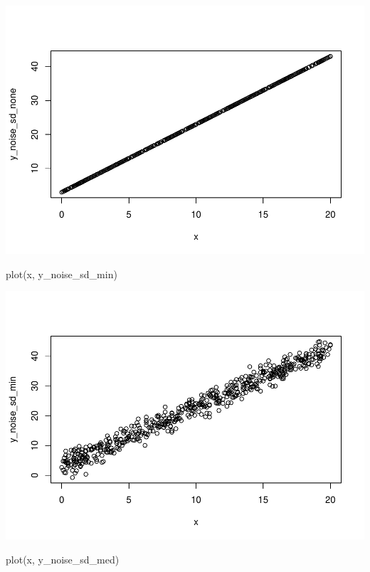 \documentclass[
]{book}
\newenvironment{Shaded}{\begin{snugshade}}{\end{snugshade}}
\newcommand{\FunctionTok}[1]{\textcolor[rgb]{0.00,0.00,0.00}{#1}}
\newcommand{\NormalTok}[1]{#1}
\begin{document}
\includegraphics{test_course_notes_files/figure-latex/unnamed-chunk-80-1.pdf}

\begin{Shaded}
\begin{Highlighting}[]
\FunctionTok{plot}\NormalTok{(x, y\_noise\_sd\_min)}
\end{Highlighting}
\end{Shaded}

\includegraphics{test_course_notes_files/figure-latex/unnamed-chunk-80-2.pdf}

\begin{Shaded}
\begin{Highlighting}[]
\FunctionTok{plot}\NormalTok{(x, y\_noise\_sd\_med)}
\end{Highlighting}
\end{Shaded}
\end{document}
